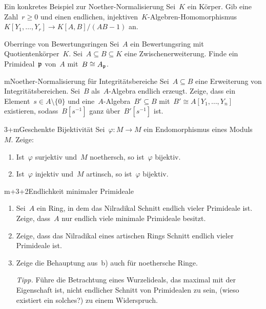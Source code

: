 \documentclass{uebblatt}
\begin{document}

\begin{aufgabe}{4}{Ein konkretes Beispiel zur Noether-Normalisierung}
Sei~$K$ ein Körper. Gib eine Zahl~$r \geq 0$ und einen endlichen,
injektiven~$K$-Algebren-Homomorphismus~$K[Y_1,\ldots,Y_r] \to K[A,B]/(AB-1)$
an.
\end{aufgabe}

\begin{aufgabe}{3}{Oberringe von Bewertungsringen}
Sei~$A$ ein Bewertungsring mit Quotientenkörper~$K$. Sei~$A \subseteq B
\subseteq K$ eine Zwischenerweiterung. Finde ein Primideal~$\mathfrak{p}$ von~$A$
mit~$B \cong A_{\mathfrak{p}}$.
\end{aufgabe}

\begin{aufgabe}{m}{Noether-Normalisierung für Integritätsbereiche}
Sei~$A \subseteq B$ eine Erweiterung von Integritätsbereichen. Sei~$B$
als~$A$-Algebra endlich erzeugt. Zeige, dass ein Element~$s \in A \setminus
\{0\}$ und eine~$A$-Algebra~$B' \subseteq B$ mit~$B' \cong A[Y_1,\ldots,Y_n]$
existieren, sodass~$B[s^{-1}]$ ganz über~$B'[s^{-1}]$ ist.
\end{aufgabe}

\begin{aufgabe}{3+m}{Geschenkte Bijektivität}
Sei~$\varphi : M \to M$ ein Endomorphismus eines Moduls~$M$. Zeige:
\begin{enumerate}
\item Ist~$\varphi$ surjektiv und~$M$ noethersch, so ist~$\varphi$ bijektiv.
\item Ist~$\varphi$ injektiv und~$M$ artinsch, so ist~$\varphi$ bijektiv.
\end{enumerate}
\end{aufgabe}

\begin{aufgabe}{m+3+2}{Endlichkeit minimaler Primideale}
\begin{enumerate}
\item Sei~$A$ ein Ring, in dem das Nilradikal Schnitt endlich vieler Primideale
ist. Zeige, dass~$A$ nur endlich viele minimale Primideale besitzt.
\item Zeige, dass das Nilradikal eines artischen Rings Schnitt
endlich vieler Primideale ist.
\item Zeige die Behauptung aus~b) auch für noethersche Ringe.

{\scriptsize\emph{Tipp.} Führe die Betrachtung eines Wurzelideals, das maximal
mit der Eigenschaft ist, nicht endlicher Schnitt von Primidealen zu sein, (wieso
existiert ein solches?) zu einem Widerspruch.\par}
\end{enumerate}
\end{aufgabe}
\end{document}
